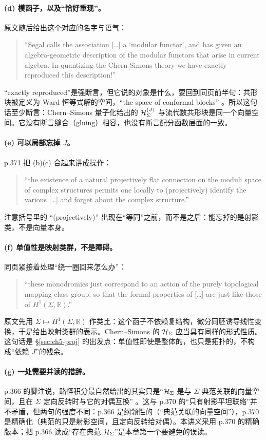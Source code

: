 \paragraph{(d) 模函子，以及“恰好重现”。}原文随后给出这个对应的名字与语气：
\begin{quote}\small
“Segal calls the association [\dots] a `modular functor', and has given an algebra-geometric description of the modular functors that arise in current algebra. In quantizing the Chern-Simons theory we have exactly reproduced this description!” 
\end{quote}
“exactly reproduced”是强断言，但它说的对象是什么，要回到同页前半句：共形块被定义为 Ward 恒等式解的空间，“the space of conformal blocks” 。所以这句话至少断言：Chern--Simons 量子化给出的 $\mathcal{H}_\Sigma^{(J)}$ 与流代数共形块是同一个向量空间。它没有断言缝合（gluing）相容，也没有断言配分函数层面的一致。

\paragraph{(e) 可以局部忘掉 $J$。}p.371 把 (b)(c) 合起来讲成操作：
\begin{quote}\small
“the existence of a natural projectively flat connection on the moduli space of complex structures permits one locally to (projectively) identify the various [\dots] and forget about the complex structure.” 
\end{quote}
注意括号里的 “(projectively)” 出现在“等同”之前，而不是之后：能忘掉的是射影类，不是向量本身。

\paragraph{(f) 单值性是映射类群，不是障碍。}同页紧接着处理“绕一圈回来怎么办”：
\begin{quote}\small
“these monodromies just correspond to an action of the purely topological mapping class group, so that the formal properties of [\dots] are just like those of $H^1(\Sigma,\mathbb R)$.” 
\end{quote}
原文先用 $\Sigma\mapsto H^1(\Sigma,\mathbb R)$ 作类比：这个函子不依赖复结构，微分同胚诱导线性变换，于是给出映射类群的表示。Chern--Simons 的 $\mathcal{H}_\Sigma$ 应当具有同样的形式性质。这句话是 \S\ref{sec:ch5-proj} 的出发点：单值性即使是整体的，也只是拓扑的，不构成“依赖 $J$”的残余。

\paragraph{(g) 一处需要并读的措辞。}p.366 的脚注说，路径积分最自然给出的其实只是“$\mathcal{H}_\Sigma$ 是与 $\Sigma$ 典范关联的向量空间，且在 $\Sigma$ 定向反转时与它的对偶互换” 。这与 p.370 的“只有射影平坦联络”并不矛盾，但两句的强度不同：p.366 是纲领性的（“典范关联的向量空间”），p.370 是精确化（典范的只是射影空间，且定向反转给对偶）。本讲义采用 p.370 的精确版本；把 p.366 读成“存在典范 $\mathcal{H}_\Sigma$”是本章第一个要避免的误读。

